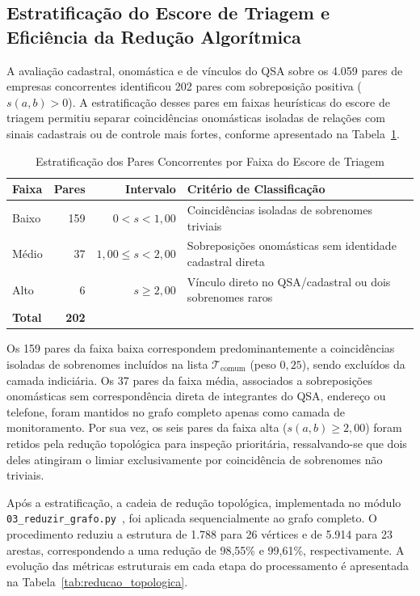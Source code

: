 \subsection{Estratificação do Escore de Triagem e Eficiência da Redução Algorítmica}

A avaliação cadastral, onomástica e de vínculos do QSA sobre os 4.059 pares de empresas concorrentes identificou 202 pares com sobreposição positiva ($s(a,b)>0$). A estratificação desses pares em faixas heurísticas do escore de triagem permitiu separar coincidências onomásticas isoladas de relações com sinais cadastrais ou de controle mais fortes, conforme apresentado na Tabela~\ref{tab:estratificacao}.
\begin{table}[!h]
  \centering
  \caption{Estratificação dos Pares Concorrentes por Faixa do Escore de Triagem}
  \label{tab:estratificacao}
  \footnotesize
  \begin{tabular}{lrrp{3.2cm}}
    \hline
    \textbf{Faixa} & \textbf{Pares} & \textbf{Intervalo} & \textbf{Critério de Classificação} \\
    \hline
    Baixo & 159 & $0 < s < 1{,}00$ & Coincidências isoladas de sobrenomes triviais \\
    Médio & 37  & $1{,}00 \leq s < 2{,}00$ & Sobreposições onomásticas sem identidade cadastral direta \\
    Alto  & 6   & $s \geq 2{,}00$ & Vínculo direto no QSA/cadastral ou dois sobrenomes raros \\
    \hline
    \textbf{Total} & \textbf{202} & & \\
    \hline
  \end{tabular}
\end{table}

Os 159 pares da faixa baixa correspondem predominantemente a coincidências isoladas de sobrenomes incluídos na lista $\mathcal{T}_{\mathrm{comum}}$ (peso $0{,}25$), sendo excluídos da camada indiciária. Os 37 pares da faixa média, associados a sobreposições onomásticas sem correspondência direta de integrantes do QSA, endereço ou telefone, foram mantidos no grafo completo apenas como camada de monitoramento. Por sua vez, os seis pares da faixa alta ($s(a,b)\geq 2{,}00$) foram retidos pela redução topológica para inspeção prioritária, ressalvando-se que dois deles atingiram o limiar exclusivamente por coincidência de sobrenomes não triviais.

Após a estratificação, a cadeia de redução topológica, implementada no módulo \texttt{03\_reduzir\_grafo.py}~\cite{projeto_github}, foi aplicada sequencialmente ao grafo completo. O procedimento reduziu a estrutura de 1.788 para 26 vértices e de 5.914 para 23 arestas, correspondendo a uma redução de 98{,}55\% e 99{,}61\%, respectivamente. A evolução das métricas estruturais em cada etapa do processamento é apresentada na Tabela~\ref{tab:reducao_topologica}.

